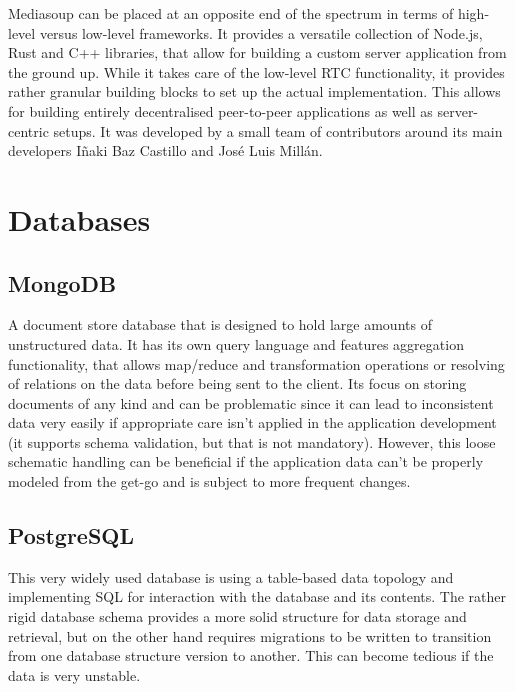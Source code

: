 Mediasoup can be placed at an opposite end of the spectrum in terms of high-level versus low-level frameworks. It provides a versatile collection of Node.js, Rust and C++ libraries, that allow for building a custom server application from the ground up. While it takes care of the low-level \ac{RTC} functionality, it provides rather granular building blocks to set up the actual implementation. This allows for building entirely decentralised peer-to-peer applications as well as server-centric setups. It was developed by a small team of contributors around its main developers Iñaki Baz Castillo and José Luis Millán.

\section{Databases}

\subsection{MongoDB}

A document store database that is designed to hold large amounts of unstructured data. It has its own query language and features aggregation functionality, that allows map/reduce and transformation operations or resolving of relations on the data before being sent to the client. Its focus on storing documents of any kind and can be problematic since it can lead to inconsistent data very easily if appropriate care isn't applied in the application development (it supports schema validation, but that is not mandatory). However, this loose schematic handling can be beneficial if the application data can't be properly modeled from the get-go and is subject to more frequent changes.

\subsection{PostgreSQL}

This very widely used database is using a table-based data topology and implementing \ac{SQL} for interaction with the database and its contents. The rather rigid database schema provides a more solid structure for data storage and retrieval, but on the other hand requires migrations to be written to transition from one database structure version to another. This can become tedious if the data is very unstable.
